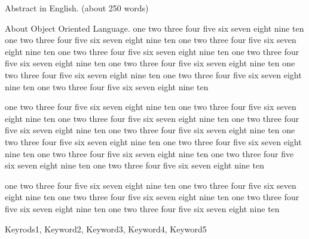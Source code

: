 \documentclass{funthesis}
\begin{document}
\maketitle       %

\begin{eabstract}
Abstract in English. (about 250 words)

About Object Oriented Language.
one two three four five six seven eight nine ten
one two three four five six seven eight nine ten
one two three four five six seven eight nine ten
one two three four five six seven eight nine ten
one two three four five six seven eight nine ten
one two three four five six seven eight nine ten
one two three four five six seven eight nine ten
one two three four five six seven eight nine ten
one two three four five six seven eight nine ten

one two three four five six seven eight nine ten
one two three four five six seven eight nine ten
one two three four five six seven eight nine ten
one two three four five six seven eight nine ten
one two three four five six seven eight nine ten
one two three four five six seven eight nine ten
one two three four five six seven eight nine ten
one two three four five six seven eight nine ten
one two three four five six seven eight nine ten
one two three four five six seven eight nine ten

one two three four five six seven eight nine ten
one two three four five six seven eight nine ten
one two three four five six seven eight nine ten
one two three four five six seven eight nine ten
one two three four five six seven eight nine ten
\end{eabstract}

\begin{ekeyword}
Keyrods1, Keyword2, Keyword3, Keyword4, Keyword5
\end{ekeyword}
\end{document}
